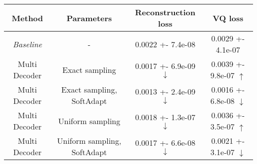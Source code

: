 \centering
\scriptsize
\begin{tabular}{||c|c|c|c||}
\hline
 Method & Parameters & Reconstruction loss & VQ loss \\
\hline
\textit{Baseline} & - & 0.0022 +- 7.4e-08 & 0.0029 +- 4.1e-07 \\
\hline
Multi Decoder & Exact sampling & 0.0017 +- 6.9e-09  $\downarrow$ & 0.0039 +- 9.8e-07  $\uparrow$ \\
\hline
Multi Decoder & Exact sampling, SoftAdapt & 0.0013 +- 2.4e-09  \textbf{$\downarrow$} & 0.0016 +- 6.8e-08  \textbf{$\downarrow$} \\
\hline
Multi Decoder & Uniform sampling & 0.0018 +- 1.3e-07  $\downarrow$ & 0.0036 +- 3.5e-07  $\uparrow$ \\
\hline
Multi Decoder & Uniform sampling, SoftAdapt & 0.0017 +- 6.6e-08  \textbf{$\downarrow$} & 0.0021 +- 3.1e-07  \textbf{$\downarrow$} \\
\hline
\end{tabular}
